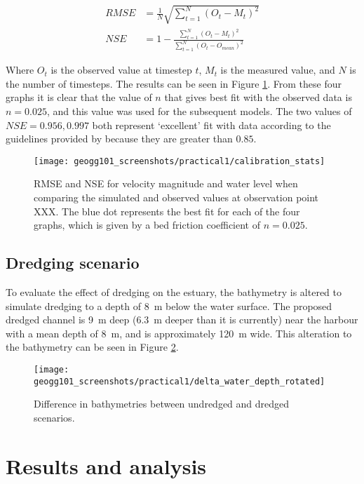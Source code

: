 \documentclass{article}
\begin{document}
\begin{align*}
    RMSE &= \frac{1}{N} \sqrt{ \sum_{t = 1}^N ( O_t - M_t) ^ 2 }\\
    NSE  &= 1 - \frac{\sum_{t = 1}^N ( O_t - M_t) ^ 2 }{\sum_{t = 1}^N ( O_t - O_{mean}) ^ 2 }
\end{align*}

Where $O_t$ is the observed value at timestep $t$, $M_t$ is the measured value, and $N$ is the number of timesteps. The results can be seen in Figure \ref{fig:calibration_stats}. From these four graphs it is clear that the value of $n$ that gives best fit with the observed data is $n = 0.025$, and this value was used for the subsequent models. The two values of $NSE = 0.956, 0.997$ both represent `excellent' fit with data according to the guidelines provided by \textcite{henriksen2008assessment} because they are greater than $0.85$. 


\begin{figure}[hbp]
    \centering
    \texttt{[image: geogg101\_screenshots/practical1/calibration\_stats]}
    \caption{RMSE and NSE for velocity magnitude and water level when comparing the simulated and observed values at observation point XXX. The blue dot represents the best fit for each of the four graphs, which is given by a bed friction coefficient of $n = 0.025$.}
    \label{fig:calibration_stats}
\end{figure}

\newpage
\subsection{Dredging scenario}

To evaluate the effect of dredging on the estuary, the bathymetry is altered to simulate dredging to a depth of \SI{8}{m} below the water surface. The proposed dredged channel is \SI{9}{m} deep (\SI{6.3}{m} deeper than it is currently) near the harbour with a mean depth of \SI{8}{m}, and is approximately \SI{120}{m} wide. This alteration to the bathymetry can be seen in Figure \ref{fig:delta_depth}.

\begin{figure}[hbp]
    \centering
    \texttt{[image: geogg101\_screenshots/practical1/delta\_water\_depth\_rotated]}
    \caption{Difference in bathymetries between undredged and dredged scenarios.}
    \label{fig:delta_depth}
\end{figure}

\newpage
\section{Results and analysis}
\end{document}
